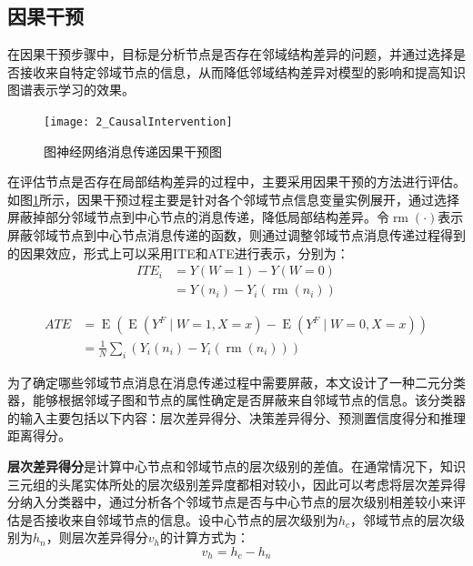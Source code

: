 \documentclass[algorithmlist, AutoFakeBold, AutoFakeSlant, figurelist, tablelist, nomlist, engineering]{seuthesix}
\begin{document}
\subsection{因果干预}
在因果干预步骤中，目标是分析节点是否存在邻域结构差异的问题，并通过选择是否接收来自特定邻域节点的信息，从而降低邻域结构差异对模型的影响和提高知识图谱表示学习的效果。
\begin{figure}
  \centering
  \texttt{[image: 2\_CausalIntervention]}
  \caption{图神经网络消息传递因果干预图}
  \label{2_CausalIntervention}
\end{figure}

在评估节点是否存在局部结构差异的过程中，主要采用因果干预的方法进行评估。如图\ref{2_CausalIntervention}所示，因果干预过程主要是针对各个邻域节点信息变量实例展开，通过选择屏蔽掉部分邻域节点到中心节点的消息传递，降低局部结构差异。令$\operatorname{rm}(\cdot)$表示屏蔽邻域节点到中心节点消息传递的函数，则通过调整邻域节点消息传递过程得到的因果效应，形式上可以采用ITE和ATE进行表示，分别为：
\begin{equation}
  \begin{aligned}
    ITE_i & =Y(W=1) - Y(W=0) \\
    & =Y(n_i)-Y_i(\operatorname{rm}(n_i))
  \end{aligned}
  \label{equation_CausalInterventionITE}
\end{equation}

\begin{equation}
  \begin{aligned}
    ATE & =\operatorname{E}\left(\operatorname{E}\left(Y^F \mid W=1, X=x\right)-\operatorname{E}\left(Y^F \mid W=0, X=x\right)\right) \\
    & =\frac{1}{N} \sum_i\left(Y_i(n_i)-Y_i(\operatorname{rm}(n_i))\right)
  \end{aligned}
  \label{equation_CausalInterventionATE}
\end{equation}

为了确定哪些邻域节点消息在消息传递过程中需要屏蔽，本文设计了一种二元分类器，能够根据邻域子图和节点的属性确定是否屏蔽来自邻域节点的信息。该分类器的输入主要包括以下内容：层次差异得分、决策差异得分、预测置信度得分和推理距离得分。

\textbf{层次差异得分}是计算中心节点和邻域节点的层次级别的差值。在通常情况下，知识三元组的头尾实体所处的层次级别差异度都相对较小，因此可以考虑将层次差异得分纳入分类器中，通过分析各个邻域节点是否与中心节点的层次级别相差较小来评估是否接收来自邻域节点的信息。设中心节点的层次级别为$h_c$，邻域节点的层次级别为$h_n$，则层次差异得分$v_h$的计算方式为：
\begin{equation}
  v_h = h_c - h_n
  \label{get1}
\end{equation}
\end{document}
